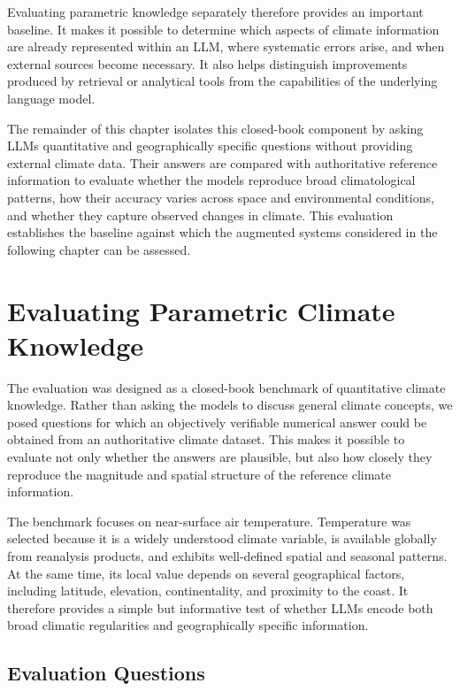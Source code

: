 Evaluating parametric knowledge separately therefore provides an important baseline. It makes it possible to determine which aspects of climate information are already represented within an LLM, where systematic errors arise, and when external sources become necessary. It also helps distinguish improvements produced by retrieval or analytical tools from the capabilities of the underlying language model.

The remainder of this chapter isolates this closed-book component by asking LLMs quantitative and geographically specific questions without providing external climate data. Their answers are compared with authoritative reference information to evaluate whether the models reproduce broad climatological patterns, how their accuracy varies across space and environmental conditions, and whether they capture observed changes in climate. This evaluation establishes the baseline against which the augmented systems considered in the following chapter can be assessed.

\section{Evaluating Parametric Climate Knowledge}

The evaluation was designed as a closed-book benchmark of quantitative climate knowledge. Rather than asking the models to discuss general climate concepts, we posed questions for which an objectively verifiable numerical answer could be obtained from an authoritative climate dataset. This makes it possible to evaluate not only whether the answers are plausible, but also how closely they reproduce the magnitude and spatial structure of the reference climate information.

The benchmark focuses on near-surface air temperature. Temperature was selected because it is a widely understood climate variable, is available globally from reanalysis products, and exhibits well-defined spatial and seasonal patterns. At the same time, its local value depends on several geographical factors, including latitude, elevation, continentality, and proximity to the coast. It therefore provides a simple but informative test of whether LLMs encode both broad climatic regularities and geographically specific information.


\subsection{Evaluation Questions}

